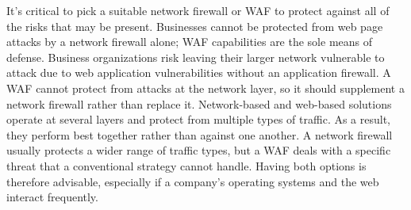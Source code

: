 It's critical to pick a suitable network firewall or WAF to protect against all of the risks that may be present. Businesses cannot be protected from web page attacks by a network firewall alone; WAF capabilities are the sole means of defense. Business organizations risk leaving their larger network vulnerable to attack due to web application vulnerabilities without an application firewall. A WAF cannot protect from attacks at the network layer, so it should supplement a network firewall rather than replace it. Network-based and web-based solutions operate at several layers and protect from multiple types of traffic. As a result, they perform best together rather than against one another. A network firewall usually protects a wider range of traffic types, but a WAF deals with a specific threat that a conventional strategy cannot handle. Having both options is therefore advisable, especially if a company's operating systems and the web interact frequently.

	
% 		

